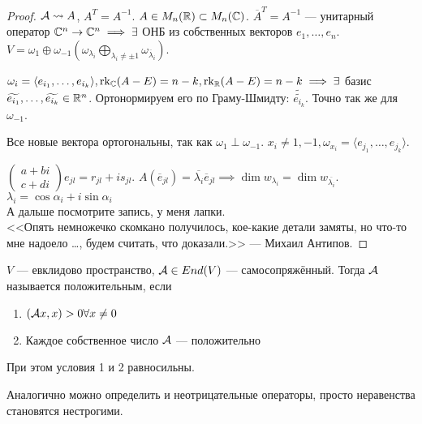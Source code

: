 \begin{proof}
    $\mathcal{A} \leadsto A$,  $A^T = A^{-1}$.  $A \in M_n(\mathbb{R}) \subset M_n(\mathbb{C})$.  $\overline{A}^T = A^{-1}$ --- унитарный оператор $\mathbb{C}^n \to \mathbb{C}^n \implies \exists$ ОНБ из собственных векторов  $e_1, \ldots, e_n$. $V = \omega_1 \oplus \omega_{-1} (\omega_{\lambda_i} \bigoplus\limits_{\lambda_i \neq \pm 1} \omega_{\overline{\lambda}_i})$.

    $\omega_i = \langle e_{i_1}, \ldots, e_{i_k} \rangle, \operatorname{rk}_\mathbb{C} (A - E) = n - k, \operatorname{rk}_\mathbb{R} (A-E) = n - k \implies \exists$ базис $\widetilde{e_{i_1}}, \ldots, \widetilde{e_{i_k}} \in \mathbb{R}^n$. Ортонормируем его по Граму-Шмидту: $\widetilde{\widetilde{e_{i_k}}}$. Точно так же для  $\omega_{-1}$.

    Все новые вектора ортогональны, так как  $\omega_{1} \perp \omega_{-1}$.  $x_i \neq 1, -1, \omega_{x_i} = \langle e_{j_1}, \ldots , e_{j_k} \rangle$.

    $\begin{pmatrix} a + bi \\ c + di \end{pmatrix} e_{jl} = r_{jl} + is_{jl}$. $A(\overline{e}_{jl}) = \overline{\lambda_i} \overline{e}_{jl} \implies \dim w_{\lambda_i} = \dim w_{\overline{\lambda_i}}$.\\
$\lambda_i = \cos \alpha_i + i\sin \alpha_i$\\
А дальше посмотрите запись, у меня лапки.\\
<<Опять немножечко скомкано получилось, кое-какие детали замяты, но что-то мне надоело \ldots, будем считать, что доказали.>> — Михаил Антипов.
\end{proof}


\begin{definition}
    $V$ --- евклидово пространство, $\mathcal{A} \in End(V)$ --- самосопряжённый. Тогда $\mathcal{A}$ называется положительным, если 

    \begin{enumerate}
	\item $(\mathcal{A} x, x) > 0 \forall x \neq 0$
	\item Каждое собственное число $\mathcal{A}$ --- положительно
    \end{enumerate}

    При этом условия 1 и 2 равносильны.

    Аналогично можно определить и неотрицательные операторы, просто неравенства становятся нестрогими.
\end{definition}

